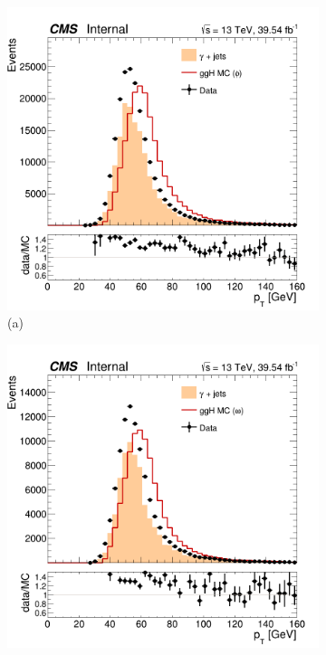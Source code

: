 \begin{figure}[!ht]
    \captionsetup[subfigure]{labelformat=empty}
    \vspace*{-0.2cm}
    \centering
    \setlength{\mylength}{\textwidth}
    \begin{subfigure}[t]{0.50\mylength}
        \centering
        \includegraphics[width=0.49\mylength]{resources/plots/Phi3_pt.png}
        \vspace*{-0.2cm}
        \caption{\footnotesize (a)}
    \end{subfigure}%
    \begin{subfigure}[t]{0.50\mylength}
        \centering
        \includegraphics[width=0.49\mylength]{resources/plots/Omega_pt.png}

\end{subfigure}
\end{figure}
